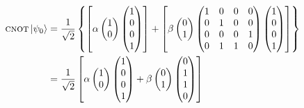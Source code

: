 \begin{align}
\operatorname{\textsc{cnot}} \ket{\psi_0} &= \frac{1}{\sqrt{2}}\left\{\left[\alpha \begin{pmatrix}
1 \\
0 
\end{pmatrix}  \begin{pmatrix}
1 \\
0 \\
0 \\
1
\end{pmatrix}\right] + \left[\beta \begin{pmatrix}
0 \\
1
\end{pmatrix} \begin{pmatrix}
1 & 0 & 0 & 0 \\
0 & 1 & 0 & 0 \\
0 & 0 & 0 & 1 \\
0 & 1 & 1 & 0
\end{pmatrix} 
\begin{pmatrix}
1 \\
0 \\
0 \\
1
\end{pmatrix}\right] \right\} \nonumber \\ 
&=\frac{1}{\sqrt{2}}\left[\alpha \begin{pmatrix}
1 \\
0 
\end{pmatrix}  \begin{pmatrix}
1 \\
0 \\
0 \\
1
\end{pmatrix} + \beta \begin{pmatrix} 
0 \\
1
\end{pmatrix} \begin{pmatrix}
0 \\
1 \\
1 \\
0
\end{pmatrix}\right]
\end{align}

